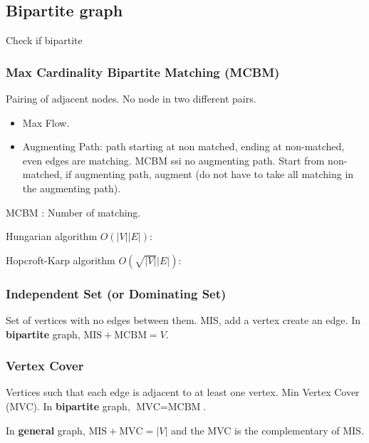 \subsection{Bipartite graph}
Check if bipartite

\subsubsection{Max Cardinality Bipartite Matching (MCBM)}
Pairing of adjacent nodes. No node in two different pairs.
\begin{itemize}
  \item Max Flow.
  \item Augmenting Path: path starting at non matched, ending
    at non-matched, even edges are matching.
    MCBM ssi no augmenting path.
    Start from non-matched, if augmenting path, augment
    (do not have to take all matching in the augmenting path).
\end{itemize}
MCBM : Number of matching.

Hungarian algorithm $O(|V||E|)$:


Hopcroft-Karp algorithm $O(\sqrt{|V|}|E|)$:


\subsubsection{Independent Set (or Dominating Set)}
Set of vertices with no edges between them.
MIS, add a vertex create an edge.
In \textbf{bipartite} graph,
$\text{MIS} + \text{MCBM} = V$.

\subsubsection{Vertex Cover}
Vertices such that each edge is adjacent to at least one vertex.
Min Vertex Cover (MVC). In \textbf{bipartite} graph,
$\text{MVC} = \text{MCBM}$.

In \textbf{general} graph,
$\text{MIS} + \text{MVC} = |V|$ and the MVC is the complementary of MIS.

